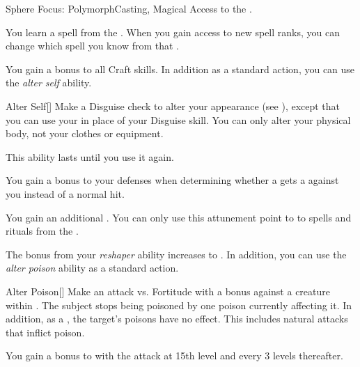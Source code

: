     \begin{feat}{Sphere Focus: Polymorph}{Casting, Magical}
        \featpre Access to the  .

         You learn a spell from the  .
        When you gain access to new spell ranks, you can change which spell you know from that .

         You gain a  bonus to all Craft skills.
        In addition as a standard action, you can use the \textit{alter self} ability.
        \begin{freeability}{Alter Self}[]
            Make a Disguise check to alter your appearance (see ), except that you can use your  in place of your Disguise skill.
            You can only alter your physical body, not your clothes or equipment.

            This ability lasts until you use it again.
        \end{freeability}

         You gain a  bonus to your defenses when determining whether a  gets a  against you instead of a normal hit.

         You gain an additional .
        You can only use this attunement point to  to spells and rituals from the  .

         The bonus from your \textit{reshaper} ability increases to .
        In addition, you can use the \textit{alter poison} ability as a standard action.
        \begin{freeability}{Alter Poison}[]
            Make an attack vs. Fortitude with a   bonus against a creature within \shortrange.
            \hit The subject stops being poisoned by one poison currently affecting it.
            In addition, as a , the target's  poisons have no effect.
            This includes natural attacks that inflict poison.

            \rankline
            You gain a  bonus to  with the attack at 15th level and every 3 levels thereafter.
        \end{freeability}


\end{feat}
